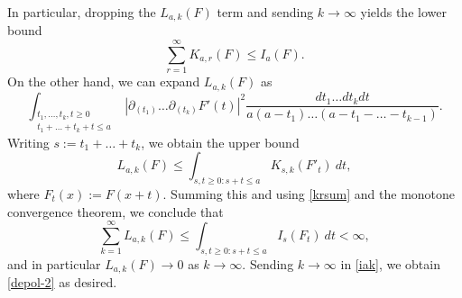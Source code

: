 In particular, dropping the $L_{a,k}(F)$ term and sending $k \to \infty$ yields the lower bound
\begin{equation}\label{krsum}
\sum_{r=1}^\infty K_{a,r}(F) \leq I_a(F).
\end{equation}
On the other hand, we can expand $L_{a,k}(F)$ as
$$ \int_{\substack{t_1,\dots,t_k,t \geq 0\\t_1+\dots+t_k+t \leq a}} |\partial_{(t_1)} \dots \partial_{(t_k)} F'(t)|^2 \frac{dt_1 \dots dt_k dt}{a(a-t_1) \dots (a-t_1-\dots-t_{k-1})}.$$
Writing $s := t_1 + \dots + t_k$, we obtain the upper bound
$$ L_{a,k}(F) \leq \int_{s,t \geq 0: s+t \leq a} K_{s,k}( F'_t )\ dt,$$
where $F_t(x) := F(x+t)$.  Summing this and using \eqref{krsum} and the monotone convergence theorem, we conclude that
$$ \sum_{k=1}^\infty L_{a,k}(F) \leq \int_{s,t \geq 0: s+t \leq a} I_{s}( F_t )\ dt < \infty,$$
and in particular $L_{a,k}(F) \to 0$ as $k \to \infty$.  Sending $k \to \infty$ in \eqref{iak}, we obtain \eqref{depol-2} as desired.

